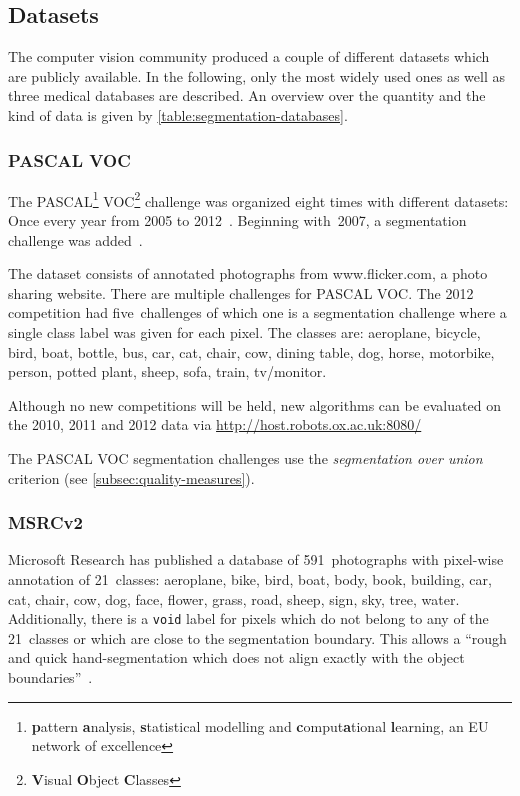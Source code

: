 
\subsection{Datasets}

The computer vision community produced a couple of different datasets which are
publicly available. In the following, only the most widely used ones as well as
three medical databases are described. An overview over the quantity and
the kind of data is given by
\cref{table:segmentation-databases}.


\subsubsection{PASCAL VOC}

The PASCAL\footnote{\textbf{p}attern \textbf{a}nalysis, \textbf{s}tatistical
modelling and \textbf{c}omput\textbf{a}tional \textbf{l}earning, an EU network
of excellence} VOC\footnote{\textbf{V}isual \textbf{O}bject \textbf{C}lasses}
challenge was organized eight times with different datasets: Once every year
from 2005 to 2012~\cite{pascal-voc-2012}. Beginning with~2007, a segmentation
challenge was added~\cite{pascal-voc-2007}.

The dataset consists of annotated photographs from www.flicker.com, a photo
sharing website. There are multiple challenges for PASCAL VOC. The 2012
competition had five~challenges of which one is a segmentation challenge where
a single class label was given for each pixel. The classes are: aeroplane,
bicycle, bird, boat, bottle, bus, car, cat, chair, cow, dining table, dog,
horse, motorbike, person, potted plant, sheep, sofa, train, tv/monitor.

Although no new competitions will be held, new algorithms can be evaluated on
the 2010, 2011 and 2012 data via
\href{http://host.robots.ox.ac.uk:8080/}{http://host.robots.ox.ac.uk:8080/}

The PASCAL VOC segmentation challenges use the \textit{segmentation over union}
criterion (see \cref{subsec:quality-measures}).


\subsubsection{MSRCv2}\label{subsubsec:MSRCv2}

Microsoft Research has published a database of 591~photographs with pixel-wise
annotation of 21~classes: aeroplane, bike, bird, boat, body, book, building,
car, cat, chair, cow, dog, face, flower, grass, road, sheep, sign, sky, tree,
water. Additionally, there is a \texttt{void} label for pixels which do not
belong to any of the 21~classes or which are close to the segmentation
boundary. This allows a \enquote{rough and quick hand-segmentation which does
not align exactly with the object boundaries}~\cite{shotton2006textonboost}.

